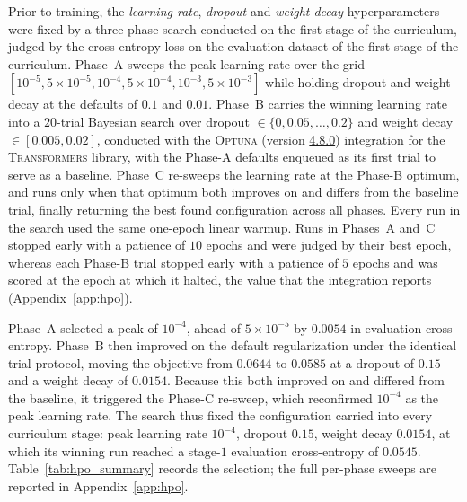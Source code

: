 \documentclass[titlepage,a4paper,11pt]{report}
\begin{document}
    Prior to training, the \textit{learning rate}, \textit{dropout} and \textit{weight decay} hyperparameters were fixed by a three-phase search conducted on the first stage of the curriculum, judged by the cross-entropy loss on the evaluation dataset of the first stage of the curriculum. Phase~A sweeps the peak learning rate over the grid $[10^{-5}, 5\times10^{-5}, 10^{-4}, 5\times10^{-4}, 10^{-3}, 5\times10^{-3}]$ while holding dropout and weight decay at the defaults of $0.1$ and $0.01$. Phase~B carries the winning learning rate into a $20$-trial Bayesian search over dropout $\in \{0, 0.05, \dots, 0.2\}$ and weight decay $\in [0.005, 0.02]$, conducted with the \textsc{Optuna} (version \href{https://github.com/optuna/optuna/tree/v4.8.0}{4.8.0}) integration for the \textsc{Transformers} library, with the Phase-A defaults enqueued as its first trial to serve as a baseline. Phase~C re-sweeps the learning rate at the Phase-B optimum, and runs only when that optimum both improves on and differs from the baseline trial, finally returning the best found configuration across all phases. Every run in the search used the same one-epoch linear warmup. Runs in Phases~A and~C stopped early with a patience of $10$ epochs and were judged by their best epoch, whereas each Phase-B trial stopped early with a patience of $5$ epochs and was scored at the epoch at which it halted, the value that the integration reports (Appendix~\ref{app:hpo}).
    
    Phase~A selected a peak of $10^{-4}$, ahead of $5\times10^{-5}$ by $0.0054$ in evaluation cross-entropy. Phase~B then improved on the default regularization under the identical trial protocol, moving the objective from $0.0644$ to $0.0585$ at a dropout of $0.15$ and a weight decay of $0.0154$. Because this both improved on and differed from the baseline, it triggered the Phase-C re-sweep, which reconfirmed $10^{-4}$ as the peak learning rate. The search thus fixed the configuration carried into every curriculum stage: peak learning rate $10^{-4}$, dropout $0.15$, weight decay $0.0154$, at which its winning run reached a stage-$1$ evaluation cross-entropy of $0.0545$. Table~\ref{tab:hpo_summary} records the selection; the full per-phase sweeps are reported in Appendix~\ref{app:hpo}.
    
\end{document}
